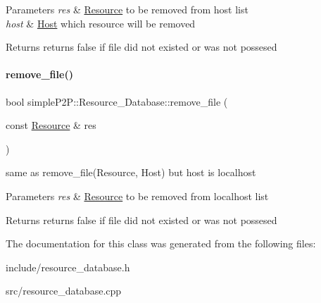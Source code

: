 \begin{DoxyParams}{Parameters}
{\em res} & \hyperlink{classsimpleP2P_1_1Resource}{Resource} to be removed from host list \\
\hline
{\em host} & \hyperlink{classsimpleP2P_1_1Host}{Host} which resource will be removed \\
\hline
\end{DoxyParams}
\begin{DoxyReturn}{Returns}
returns false if file did not existed or was not possesed 
\end{DoxyReturn}
\mbox{\label{classsimpleP2P_1_1Resource__Database_aa7e7b4575b8217dc3e52fb741ff0474a}} 
\paragraph{\texorpdfstring{remove\+\_\+file()}{remove\_file()}\hspace{0.1cm}{\footnotesize\ttfamily [2/2]}}
{\footnotesize\ttfamily bool simple\+P2\+P\+::\+Resource\+\_\+\+Database\+::remove\+\_\+file (\begin{DoxyParamCaption}\item[{const \hyperlink{classsimpleP2P_1_1Resource}{Resource} \&}]{res }\end{DoxyParamCaption})\hspace{0.3cm}{\ttfamily [inline]}}



same as remove\+\_\+file(\+Resource, Host) but host is localhost 


\begin{DoxyParams}{Parameters}
{\em res} & \hyperlink{classsimpleP2P_1_1Resource}{Resource} to be removed from localhost list \\
\hline
\end{DoxyParams}
\begin{DoxyReturn}{Returns}
returns false if file did not existed or was not possesed 
\end{DoxyReturn}


The documentation for this class was generated from the following files\+:\begin{DoxyCompactItemize}
\item 
include/resource\+\_\+database.\+h\item 
src/resource\+\_\+database.\+cpp\end{DoxyCompactItemize}

